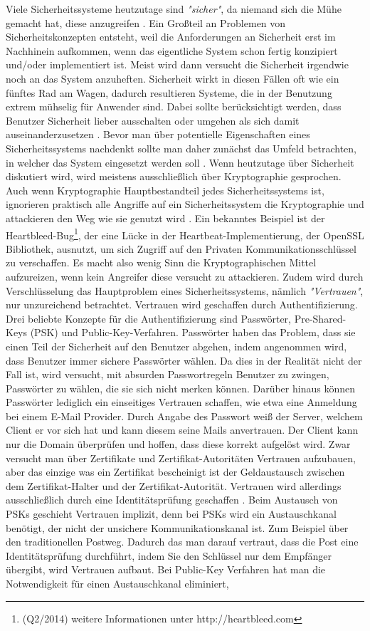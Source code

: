 \documentclass[11pt,a4paper]{report}
\begin{document}
Viele Sicherheitssysteme heutzutage sind \textit{"sicher"}, da niemand sich die Mühe gemacht hat, diese anzugreifen \cite{gutmann0}. Ein Großteil an Problemen von Sicherheitskonzepten entsteht, weil die Anforderungen an Sicherheit erst im Nachhinein aufkommen, wenn das eigentliche System schon fertig konzipiert und/oder implementiert ist. Meist wird dann versucht die Sicherheit irgendwie noch an das System anzuheften. Sicherheit wirkt in diesen Fällen oft wie ein fünftes Rad am Wagen, dadurch resultieren Systeme, die in der Benutzung extrem mühselig für Anwender sind. Dabei sollte berücksichtigt werden, dass Benutzer Sicherheit lieber ausschalten oder umgehen als sich damit auseinanderzusetzen \cite{gutmann5}. Bevor man über potentielle Eigenschaften eines Sicherheitssystems nachdenkt sollte man daher zunächst das Umfeld betrachten, in welcher das System eingesetzt werden soll \cite{gutmann4}. Wenn heutzutage über Sicherheit diskutiert wird, wird meistens ausschließlich über Kryptographie gesprochen. Auch wenn Kryptographie Hauptbestandteil jedes Sicherheitssystems ist, ignorieren praktisch alle Angriffe auf ein Sicherheitssystem die Kryptographie und attackieren den Weg wie sie genutzt wird \cite{gutmann1}. Ein bekanntes Beispiel ist der Heartbleed-Bug\footnote{(Q2/2014) weitere Informationen unter http://heartbleed.com}, der eine Lücke in der Heartbeat-Implementierung, der OpenSSL Bibliothek, ausnutzt, um sich Zugriff auf den Privaten Kommunikationsschlüssel zu verschaffen. Es macht also wenig Sinn die Kryptographischen Mittel aufzureizen, wenn kein Angreifer diese versucht zu attackieren. Zudem wird durch Verschlüsselung das Hauptproblem eines Sicherheitssystems, nämlich \textit{"Vertrauen"}, nur unzureichend betrachtet. Vertrauen wird geschaffen durch Authentifizierung. Drei beliebte Konzepte für die Authentifizierung sind Passwörter, Pre-Shared-Keys (PSK) und Public-Key-Verfahren. Passwörter haben das Problem, dass sie einen Teil der Sicherheit auf den Benutzer abgehen, indem angenommen wird, dass Benutzer immer sichere Passwörter wählen. Da dies in der Realität nicht der Fall ist, wird versucht, mit absurden Passwortregeln Benutzer zu zwingen, Passwörter zu wählen, die sie sich nicht merken können. Darüber hinaus können Passwörter lediglich ein einseitiges Vertrauen schaffen, wie etwa eine Anmeldung bei einem E-Mail Provider. Durch Angabe des Passwort weiß der Server, welchem Client er vor sich hat und kann diesem seine Mails anvertrauen. Der Client kann nur die Domain überprüfen und hoffen, dass diese korrekt aufgelöst wird. Zwar versucht man über Zertifikate und Zertifikat-Autoritäten Vertrauen aufzubauen, aber das einzige was ein Zertifikat bescheinigt ist der Geldaustausch zwischen dem Zertifikat-Halter und der Zertifikat-Autorität. Vertrauen wird allerdings ausschließlich durch eine Identitätsprüfung geschaffen \cite{gutmann8}. Beim Austausch von PSKs geschieht Vertrauen implizit, denn bei PSKs wird ein Austauschkanal benötigt, der nicht der unsichere Kommunikationskanal ist. Zum Beispiel über den traditionellen Postweg. Dadurch das man darauf vertraut, dass die Post eine Identitätsprüfung durchführt, indem Sie den Schlüssel nur dem Empfänger übergibt, wird Vertrauen aufbaut. Bei Public-Key Verfahren hat man die Notwendigkeit für einen Austauschkanal eliminiert, 
\end{document}
